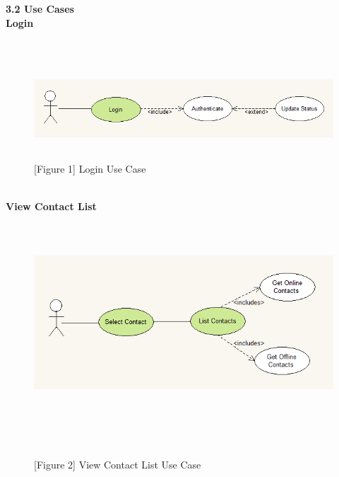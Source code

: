 \documentclass[29pt,a4paper]{moderncv}
\begin{document}
	\noindent \left\textbf{3.2 Use Cases}\\
	\vspace{4mm}
		\noindent \left\textbf{Login}\\
		\\ \begin{figure}
					\centering
					\\ \includegraphics[width=6.0in, height=1.2in]{./loginCase.png}
					\\\caption{[Figure 1] Login Use Case}
			\end{figure}\\
\newpage				
		\noindent \left\textbf{View Contact List}\\
		\begin{figure}
					\centering
					\\ \includegraphics[width=6.0in, height=2.5in]{./viewContactsCase.png} \\
					\\\caption{[Figure 2] View Contact List Use Case} \\
		\end{figure}\\ 
				
\end{document}

